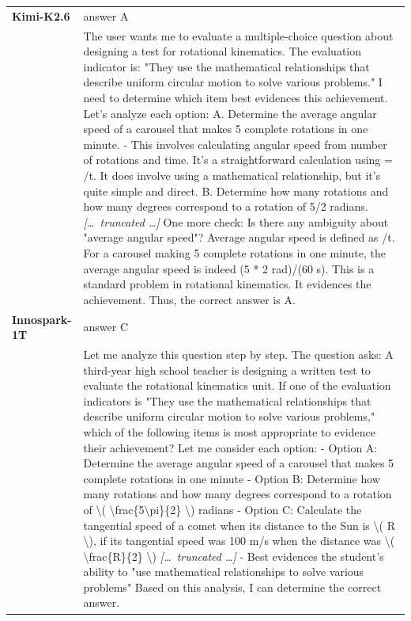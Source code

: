 \begin{longtable}{@{}l p{12.5cm}@{}}
  \midrule
  \textbf{Kimi-K2.6} & answer A \\
  & The user wants me to evaluate a multiple-choice question about designing a test for rotational kinematics. The evaluation indicator is: "They use the mathematical relationships that describe uniform circular motion to solve various problems." \newline I need to determine which item best evidences this achievement. \newline Let's analyze each option: \newline A. Determine the average angular speed of a carousel that makes 5 complete rotations in one minute. \newline - This involves calculating angular speed from number of rotations and time. It's a straightforward calculation using = /t. It does involve using a mathematical relationship, but it's quite simple and direct. \newline B. Determine how many rotations and how many degrees correspond to a rotation of 5/2 radians. \newline \textit{[\ldots\ truncated \ldots]} \newline One more check: Is there any ambiguity about "average angular speed"? Average angular speed is defined as /t. For a carousel making 5 complete rotations in one minute, the average angular speed is indeed (5 * 2 rad)/(60 s). This is a standard problem in rotational kinematics. It evidences the achievement. \newline Thus, the correct answer is A. \\
  \textbf{Innospark-1T} & answer C \\
  & Let me analyze this question step by step. \newline The question asks: A third-year high school teacher is designing a written test to evaluate the rotational kinematics unit. If one of the evaluation indicators is "They use the mathematical relationships that describe uniform circular motion to solve various problems," which of the following items is most appropriate to evidence their achievement? \newline Let me consider each option: \newline - Option A: Determine the average angular speed of a carousel that makes 5 complete rotations in one minute \newline - Option B: Determine how many rotations and how many degrees correspond to a rotation of \textbackslash{}( \textbackslash{}frac\{5\textbackslash{}pi\}\{2\} \textbackslash{}) radians \newline - Option C: Calculate the tangential speed of a comet when its distance to the Sun is \textbackslash{}( R \textbackslash{}), if its tangential speed was 100 m/s when the distance was \textbackslash{}( \textbackslash{}frac\{R\}\{2\} \textbackslash{}) \newline \textit{[\ldots\ truncated \ldots]} \newline - Best evidences the student's ability to "use mathematical relationships to solve various problems" \newline Based on this analysis, I can determine the correct answer. \\

\end{longtable}
